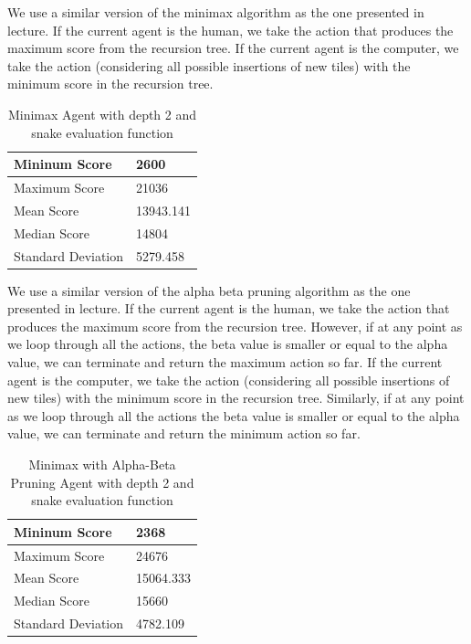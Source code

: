 \documentclass[9pt,twocolumn]{article}
\begin{document}
We use a similar version of the minimax algorithm as the one presented in lecture. If the current agent is the human, we take the action that produces the maximum score from the recursion tree. If the current agent is the computer, we take the action (considering all possible insertions of new tiles) with the minimum score in the recursion tree.

\begin{table}[!htbp]

\centering

\begin{tabular}{|l|l|}
\hline
Mininum Score      & 2600 \\ \hline
Maximum Score      & 21036 \\ \hline
Mean Score         & 13943.141 \\ \hline
Median Score       & 14804 \\ \hline
Standard Deviation & 5279.458 \\ \hline
\end{tabular}

\caption{Minimax Agent with depth 2 and snake evaluation function}

\end{table}

We use a similar version of the alpha beta pruning algorithm as the one presented in lecture. If the current agent is the human, we take the action that produces the maximum score from the recursion tree. However, if at any point as we loop through all the actions, the beta value is smaller or equal to the alpha value, we can terminate and return the maximum action so far. If the current agent is the computer, we take the action (considering all possible insertions of new tiles) with the minimum score in the recursion tree. Similarly, if at any point as we loop through all the actions the beta value is smaller or equal to the alpha value, we can terminate and return the minimum action so far. 

\begin{table}[!htbp]

\centering

\begin{tabular}{|l|l|}
\hline
Mininum Score      & 2368 \\ \hline
Maximum Score      & 24676 \\ \hline
Mean Score         & 15064.333 \\ \hline
Median Score       & 15660 \\ \hline
Standard Deviation & 4782.109 \\ \hline
\end{tabular}

\caption{Minimax with Alpha-Beta Pruning Agent with depth 2 and snake evaluation function}

\end{table}
\end{document}
